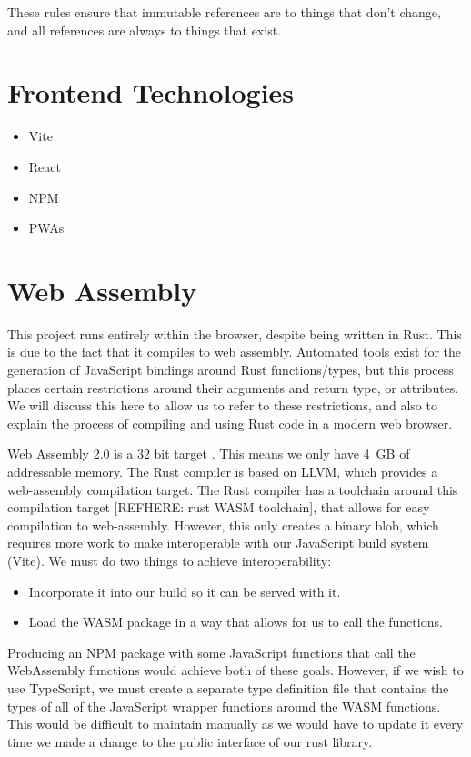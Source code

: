 These rules ensure that immutable references are to things that don't change, and all references are always to things that exist.

\section{Frontend Technologies}
\label{bg:frontend}
\label{bg:pwa}
\begin{itemize}
    \item Vite
    \item React
    \item NPM
    \item PWAs
\end{itemize}


\section{Web Assembly} \label{bg:wasm}
This project runs entirely within the browser, despite being written in Rust. This is due to the fact that it compiles to web assembly. Automated tools exist for the generation of JavaScript bindings around Rust functions/types, but this process places certain restrictions around their arguments and return type, or attributes. We will discuss this here to allow us to refer to these restrictions, and also to explain the process of compiling and using Rust code in a modern web browser. 

Web Assembly 2.0 is a 32 bit target \cite{WebAssemblyCoreSpecification2}. This means we only have 4 GB of addressable memory. The Rust compiler is based on LLVM, which provides a web-assembly compilation target. The Rust compiler has a toolchain around this compilation target [REFHERE: rust WASM toolchain], that allows for easy compilation to web-assembly. However, this only creates a binary blob, which requires more work to make interoperable with our JavaScript build system (Vite). We must do two things to achieve interoperability:
\begin{itemize}
    \item Incorporate it into our build so it can be served with it.
    \item Load the WASM package in a way that allows for us to call the functions.
\end{itemize}
Producing an NPM package with some JavaScript functions that call the WebAssembly functions would achieve both of these goals. However, if we wish to use TypeScript, we must create a separate type definition file that contains the types of all of the JavaScript wrapper functions around the WASM functions. This would be difficult to maintain manually as we would have to update it every time we made a change to the public interface of our rust library. 

